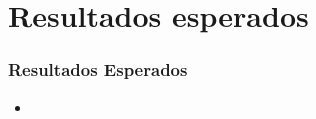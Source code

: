 \section{Resultados esperados}

\begin{frame}\frametitle{Resultados Esperados} 
\begin{itemize}
	\item 
\end{itemize}	
\end{frame}